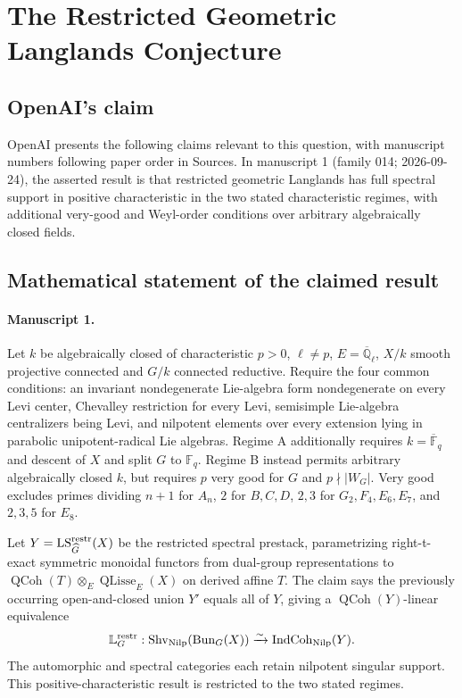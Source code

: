 \documentclass[11pt]{article}
\begin{document}
\section*{The Restricted Geometric Langlands Conjecture}

\subsection{OpenAI's claim}
OpenAI presents the following claims relevant to this question, with manuscript numbers following paper order in Sources. In manuscript 1 (family 014; 2026-09-24), the asserted result is that restricted geometric Langlands has full spectral support in positive characteristic in the two stated characteristic regimes, with additional very-good and Weyl-order conditions over arbitrary algebraically closed fields.

\subsection{Mathematical statement of the claimed result}
\paragraph{Manuscript 1.}
Let $k$ be algebraically closed of characteristic $p>0$, $\ell\ne p$, $E=\overline{\mathbb Q}_{\ell}$, $X/k$ smooth projective connected and $G/k$ connected reductive. Require the four common conditions: an invariant nondegenerate Lie-algebra form nondegenerate on every Levi center, Chevalley restriction for every Levi, semisimple Lie-algebra centralizers being Levi, and nilpotent elements over every extension lying in parabolic unipotent-radical Lie algebras. Regime A additionally requires $k=\overline{\mathbb F}_q$ and descent of $X$ and split $G$ to $\mathbb F_q$. Regime B instead permits arbitrary algebraically closed $k$, but requires $p$ very good for $G$ and $p\nmid|W_G|$. Very good excludes primes dividing $n+1$ for $A_n$, $2$ for $B,C,D$, $2,3$ for $G_2,F_4,E_6,E_7$, and $2,3,5$ for $E_8$.

Let $Y=\operatorname{LS}_{\widehat G}^{\rm restr}(X)$ be the restricted spectral prestack, parametrizing right-t-exact symmetric monoidal functors from dual-group representations to $\operatorname{QCoh}(T)\otimes_E\operatorname{QLisse}_E(X)$ on derived affine $T$. The claim says the previously occurring open-and-closed union $Y'$ equals all of $Y$, giving a $\operatorname{QCoh}(Y)$-linear equivalence
\[
 \mathbb L_G^{\rm restr}:\operatorname{Shv}_{\rm Nilp}(\operatorname{Bun}_G(X))
 \xrightarrow{\sim}\operatorname{IndCoh}_{\rm Nilp}(Y).
\]
The automorphic and spectral categories each retain nilpotent singular support. This positive-characteristic result is restricted to the two stated regimes.
\end{document}

